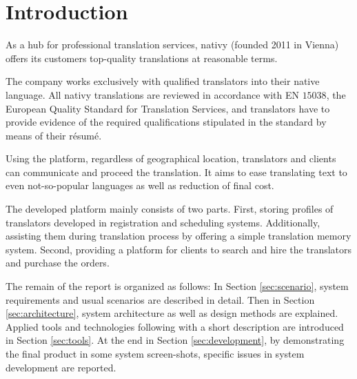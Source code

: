 \section{Introduction}
As a hub for professional translation services, nativy \cite{nativy}(founded 2011 in Vienna) offers its customers top-quality translations at reasonable terms. 

The company works exclusively with qualified translators into their native language. All nativy translations are reviewed in accordance with EN $15038$, the European Quality Standard for Translation Services, and translators have to provide evidence of the required qualifications stipulated in the standard by means of their résumé.

Using the platform, regardless of geographical location, translators and clients can communicate and proceed the translation. It aims to ease translating text to even not-so-popular languages as well as reduction of final cost.

The developed platform mainly consists of two parts. First, storing profiles of translators developed in registration and  scheduling systems. Additionally, assisting them during translation process by offering a simple translation memory system. Second, providing a platform for clients to search and hire the translators and purchase the orders.

The remain of the report is organized as follows: In Section \ref{sec:scenario}, system requirements and usual scenarios are described in detail. Then in Section \ref{sec:architecture}, system architecture as well as design methods are explained. Applied tools and technologies following with a short description are introduced in Section \ref{sec:tools}. At the end in Section \ref{sec:development}, by demonstrating the final product in some system screen-shots, specific issues in system development are reported.